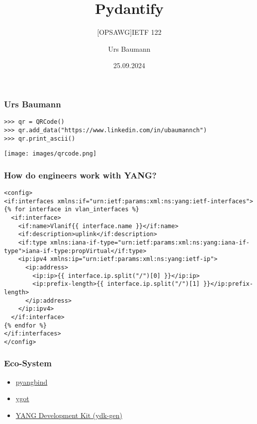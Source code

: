 \documentclass[aspectratio=169]{beamer}
\title{Pydantify}
\subtitle{[OPSAWG]IETF 122}
\author{Urs Baumann}
\date{25.09.2024}
\begin{document}
{
\frame{\titlepage}
}


\begin{frame}[fragile]
  \frametitle{Urs Baumann}

  \begin{verbatim}
>>> qr = QRCode()
>>> qr.add_data("https://www.linkedin.com/in/ubaumannch")
>>> qr.print_ascii()
  \end{verbatim}

  \texttt{[image: images/qrcode.png]}

\end{frame}


\begin{frame}[fragile]
  \frametitle{How do engineers work with YANG?}
  \begin{verbatim}
<config>
<if:interfaces xmlns:if="urn:ietf:params:xml:ns:yang:ietf-interfaces">
{% for interface in vlan_interfaces %}
  <if:interface>
    <if:name>Vlanif{{ interface.name }}</if:name>
    <if:description>uplink</if:description>
    <if:type xmlns:iana-if-type="urn:ietf:params:xml:ns:yang:iana-if-type">iana-if-type:propVirtual</if:type>
    <ip:ipv4 xmlns:ip="urn:ietf:params:xml:ns:yang:ietf-ip">
      <ip:address>
        <ip:ip>{{ interface.ip.split("/")[0] }}</ip:ip>
        <ip:prefix-length>{{ interface.ip.split("/")[1] }}</ip:prefix-length>
      </ip:address>
    </ip:ipv4>
  </if:interface>
{% endfor %}
</if:interfaces>
</config>
\end{verbatim}
\end{frame}

\begin{frame}
  \frametitle{Eco-System}
  \begin{itemize}
    \setlength\itemsep{1em}
    \item \href{https://github.com/robshakir/pyangbind}{pyangbind}
    \item \href{https://github.com/openconfig/ygot}{ygot}
    \item \href{https://github.com/CiscoDevNet/ydk-gen}{YANG Development Kit (ydk-gen)}
  \end{itemize}
\end{frame}
\end{document}
